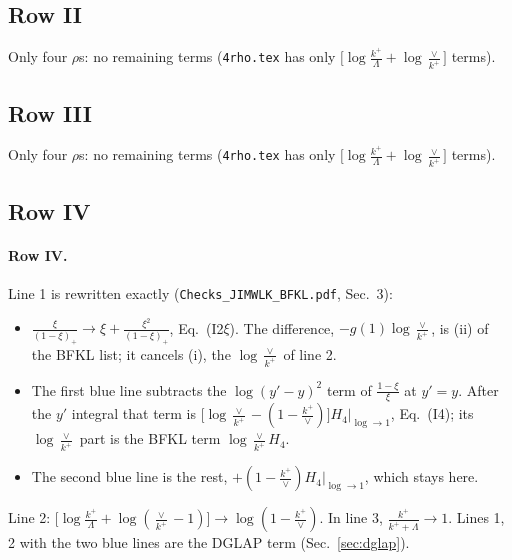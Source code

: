 \documentclass[10pt]{article}
\numberwithin{equation}{section}
\newcommand{\new}[1]{{\color{blue}#1}}
\begin{document}
\subsection{Row II}
Only four $\rho$\textquotesingle s: no remaining terms (\texttt{4rho.tex} has only $\big[\log\frac{k^+}{\Lambda}+\log\frac{\vee}{k^+}\big]$ terms).
\subsection{Row III}
Only four $\rho$\textquotesingle s: no remaining terms (\texttt{4rho.tex} has only $\big[\log\frac{k^+}{\Lambda}+\log\frac{\vee}{k^+}\big]$ terms).
\subsection{Row IV}
\paragraph{Row IV.}
Line 1 is rewritten exactly (\texttt{Checks\_JIMWLK\_BFKL.pdf}, Sec.~3):
\begin{itemize}
\item $\frac{\xi}{(1-\xi)_+}\to\xi+\frac{\xi^2}{(1-\xi)_+}$, Eq.~(I2$\xi$). The difference, $-g(1)\log\frac{\vee}{k^+}$, is (ii) of the BFKL list; it cancels (i), the $\log\frac{\vee}{k^+}$ of line 2.
\item The first \new{blue} line subtracts the $\log(y'-y)^2$ term of $\frac{1-\xi}{\xi}$ at $y'=y$. After the $y'$ integral that term is $\big[\log\frac{\vee}{k^+}-(1-\frac{k^+}{\vee})\big]H_4\big|_{\log\to1}$, Eq.~(I4); its $\log\frac{\vee}{k^+}$ part is the BFKL term $\log\frac{\vee}{k^+}H_4$.
\item The second \new{blue} line is the rest, $+(1-\frac{k^+}{\vee})H_4\big|_{\log\to1}$, which stays here.
\end{itemize}
Line 2: $\big[\log\frac{k^+}{\Lambda}+\log(\frac{\vee}{k^+}-1)\big]\to\log(1-\frac{k^+}{\vee})$. In line 3, $\frac{k^+}{k^++\Lambda}\to1$. Lines 1, 2 with the two blue lines are the DGLAP term (Sec.~\ref{sec:dglap}).
\end{document}
